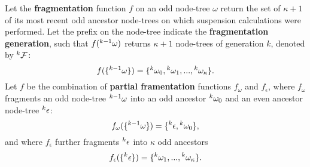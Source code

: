 
\begin{definition}\label{def:fragmentation}
  Let the \textbf{fragmentation} function $f$ on an odd node-tree $\omega$ return the set of $\kappa + 1$ of its most recent odd ancestor node-trees on which suspension calculations were performed. Let the prefix on the node-tree indicate the \textbf{fragmentation generation}, such that $f({}^{k-1}\omega)$ returns $\kappa + 1$ node-trees of generation $k$, denoted by ${}^{k}\mathcal{F}$:
  \begin{equation}\label{eq:fstep}
    f(\{\pre{k-1}\omega\}) = \{\pre{k}\omega_0,\pre{k}\omega_1,...,\pre{k}\omega_{\kappa}\}.
  \end{equation}
  Let $f$ be the combination of \textbf{partial framentation} functions $f_\omega$ and $f_\epsilon$, where $f_\omega$ fragments an odd node-tree ${}^{k-1}\omega$ into an odd ancestor ${}^{k}\omega_0$ and an even ancestor node-tree ${}^{k}\epsilon$: 
  \begin{equation}\label{eq:pfo}
    f_\omega(\{\pre{k-1}\omega\}) = \{\pre{k}\epsilon, \pre{k}\omega_0 \},
  \end{equation}
  and where $f_\epsilon$ further fragments ${}^{k}\epsilon$ into $\kappa$ odd ancestors
  \begin{equation}\label{eq:pfe}
    f_\epsilon(\{\pre{k}\epsilon\}) =\{\pre{k}\omega_1,...,\pre{k}\omega_{\kappa}\}.
  \end{equation}

\end{definition}

